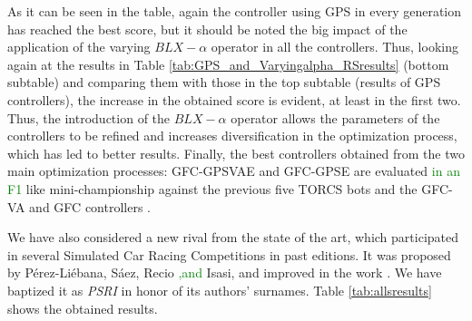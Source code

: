 \documentclass[10pt,journal,compsoc]{IEEEtran}
\begin{document}
%

As it can be seen in the table, again the controller using GPS in
every generation has reached the best score, but it should be noted the
big impact of the application of the varying $BLX-\alpha$ operator in
all the controllers. Thus, looking again at the results in Table \ref{tab:GPS_and_Varyingalpha_RSresults} (bottom subtable) 
and comparing them with those in the top subtable (results of GPS controllers), the increase in the obtained score is evident, at least in the first
two. %
Thus, the introduction of the $BLX-\alpha$ operator allows the parameters of the controllers to be refined and increases diversification in the optimization process, which has led to better results.
Finally, the best controllers obtained from the two main optimization
processes: {\sf GFC-GPSVAE} and {\sf GFC-GPSE} are evaluated \textcolor{green}{in an F1} like mini-championship against the previous five TORCS bots and the {\sf GFC-VA}\cite{DBLP:conf/cig/SalemMG19} and {\sf GFC} controllers  \cite{salem_cig2018}. 



We have also considered a new rival from the state of the art, which participated in several Simulated Car Racing Competitions in past editions. 
It was proposed by P{\'e}rez-Li{\'e}bana, S{\'a}ez, Recio \textcolor{green}{,and} Isasi, and improved in the work \cite{PerezEvolvingFuzzy09}. We have baptized it as \textit{PSRI} in honor of its authors' surnames. 
Table \ref{tab:allsresults} shows the obtained results.
%
\end{document}
